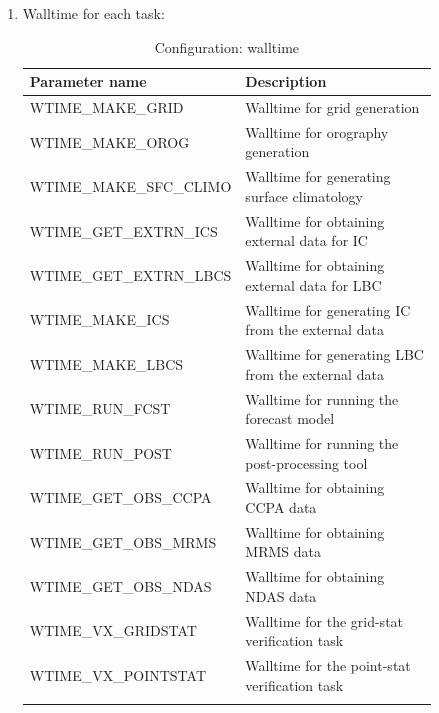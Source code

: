 \documentclass[11pt,fleqn]{report}              %
\begin{document}
\begin{enumerate}
\item Walltime for each task:
{
\scriptsize
\begin{longtable}{ p{0.3\linewidth} | p{0.55\linewidth} }
\hline
\hline
Parameter name & Description \\
\hline
WTIME\_MAKE\_GRID & Walltime for grid generation \\
WTIME\_MAKE\_OROG & Walltime for orography generation \\
WTIME\_MAKE\_SFC\_CLIMO & Walltime for generating surface climatology \\
WTIME\_GET\_EXTRN\_ICS & Walltime for obtaining external data for IC \\
WTIME\_GET\_EXTRN\_LBCS & Walltime for obtaining external data for LBC \\
WTIME\_MAKE\_ICS & Walltime for generating IC from the external data \\
WTIME\_MAKE\_LBCS & Walltime for generating LBC from the external data \\
WTIME\_RUN\_FCST & Walltime for running the forecast model \\
WTIME\_RUN\_POST & Walltime for running the post-processing tool \\
WTIME\_GET\_OBS\_CCPA & Walltime for obtaining CCPA data  \\
WTIME\_GET\_OBS\_MRMS & Walltime for obtaining MRMS data  \\
WTIME\_GET\_OBS\_NDAS & Walltime for obtaining NDAS data \\
WTIME\_VX\_GRIDSTAT & Walltime for the grid-stat verification task \\
WTIME\_VX\_POINTSTAT & Walltime for the point-stat verification task \\
\hline
\caption{Configuration: walltime}
\label{table:config_walltime}
\end{longtable}
}


\end{enumerate}
\end{document}
